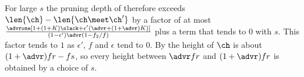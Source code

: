 For large $s$ the pruning depth of  therefore exceeds
$\len{\ch}-\len{\ch\meet\ch'}$ by a factor of at most
$\frac{\advrone[1+(1+K)\slack+\epsilon'(\advr+(1+\advr)K)]}{(1-\epsilon')\advr(1-f_2/f)}$
plus a term that tends to $0$ with $s$. This factor tends to $1$ as
$\epsilon'$, $f$ and $\epsilon$ tend to $0$. By  the
height of $\ch$ is about $(1+\advr)fr-fs$, so every height between
$\advr fr$ and $(1+\advr)fr$ is obtained by a choice of $s$.
